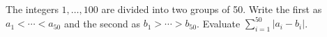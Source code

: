 The integers $1,\ldots,100$ are divided into two groups of 50. Write the first as $a_1<\cdots<a_{50}$ and the second as $b_1>\cdots>b_{50}$. Evaluate $\sum_{i=1}^{50}|a_i-b_i|$.
